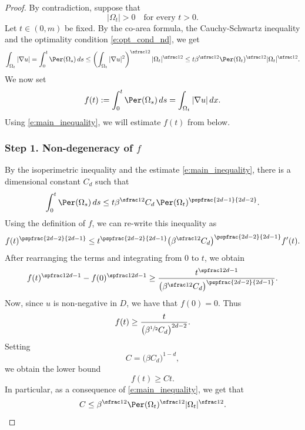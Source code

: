 \begin{proof}
By contradiction, suppose that
\[|\Omega_t|>0\quad\text{for every } t>0.\]
Let $t\in(0,m)$ be fixed. By the co-area formula, the Cauchy-Schwartz inequality and the optimality condition \eqref{e:opt_cond_nd}, we get
\begin{equation}\label{e:main_inequality}
\int_{\Omega_t}|\nabla u|=\int_0^t\Per(\Omega_s)\,ds\le \left(\int_{\Omega_t}|\nabla u|^2\right)^{\sfrac12}|\Omega_t|^{\sfrac12}\le t\beta^{\sfrac12}\Per(\Omega_t)^{\sfrac12}|\Omega_t|^{\sfrac12}.
\end{equation}
We now set
\[f(t):=\int_{0}^t \Per(\Omega_s)\,ds=\int_{\Omega_t}|\nabla u|\,dx.\]
Using \eqref{e:main_inequality}, we will estimate $f(t)$ from below.

\subsubsection*{Step 1. Non-degeneracy of $f$}
By the isoperimetric inequality and the estimate \eqref{e:main_inequality}, there is a dimensional constant $C_d$ such that
\[\int_{0}^t \Per(\Omega_s)\,ds\le t\beta^{\sfrac12}C_d\,\Per(\Omega_t)^{\pspfrac{2d-1}{2d-2}}.\]
Using the definition of $f$, we can re-write this inequality as
\[f(t)^{\pspfrac{2d-2}{2d-1}}\le t^{\pspfrac{2d-2}{2d-1}}\big(\beta^{\sfrac12}C_d\big)^{\pspfrac{2d-2}{2d-1}}f'(t).\]
After rearranging the terms and integrating from $0$ to $t$, we obtain
\[f(t)^{\spfrac1{2d-1}}-f(0)^{\spfrac1{2d-1}}\ge \frac{t^{\spfrac1{2d-1}}}{\big(\beta^{\sfrac12}C_d\big)^{\pspfrac{2d-2}{2d-1}}}.\]
Now, since $u$ is non-negative in $D$, we have that $f(0)=0$. Thus
\[f(t)\ge \frac{t}{\big(\beta^{\sfrac12}C_d\big)^{{2d-2}}}.\]
Setting
\begin{equation}\label{e:def_C}
C=\big(\beta C_d\big)^{1-d},
\end{equation}
we obtain the lower bound
\[f(t)\ge Ct.\]
In particular, as a consequence of \eqref{e:main_inequality}, we get that
\begin{equation}\label{e:induction0}
C\le \beta^{\sfrac12} \Per(\Omega_t)^{\sfrac12}|\Omega_t|^{\sfrac12}.
\end{equation}


\end{proof}
